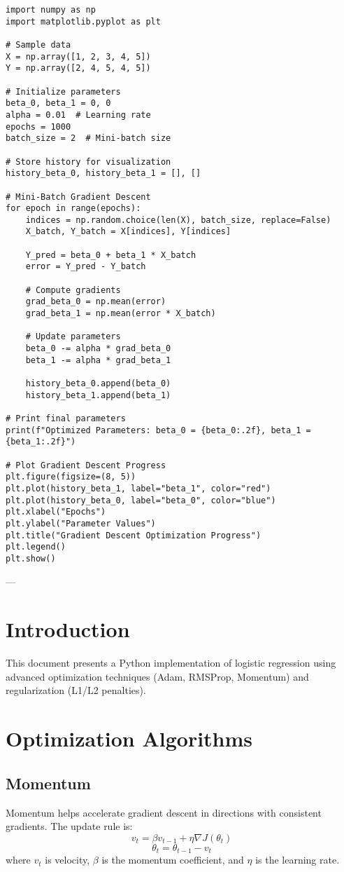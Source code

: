 \begin{verbatim}
import numpy as np
import matplotlib.pyplot as plt

# Sample data
X = np.array([1, 2, 3, 4, 5])
Y = np.array([2, 4, 5, 4, 5])

# Initialize parameters
beta_0, beta_1 = 0, 0
alpha = 0.01  # Learning rate
epochs = 1000
batch_size = 2  # Mini-batch size

# Store history for visualization
history_beta_0, history_beta_1 = [], []

# Mini-Batch Gradient Descent
for epoch in range(epochs):
    indices = np.random.choice(len(X), batch_size, replace=False)
    X_batch, Y_batch = X[indices], Y[indices]
    
    Y_pred = beta_0 + beta_1 * X_batch
    error = Y_pred - Y_batch

    # Compute gradients
    grad_beta_0 = np.mean(error)
    grad_beta_1 = np.mean(error * X_batch)
    
    # Update parameters
    beta_0 -= alpha * grad_beta_0
    beta_1 -= alpha * grad_beta_1

    history_beta_0.append(beta_0)
    history_beta_1.append(beta_1)

# Print final parameters
print(f"Optimized Parameters: beta_0 = {beta_0:.2f}, beta_1 = {beta_1:.2f}")

# Plot Gradient Descent Progress
plt.figure(figsize=(8, 5))
plt.plot(history_beta_1, label="beta_1", color="red")
plt.plot(history_beta_0, label="beta_0", color="blue")
plt.xlabel("Epochs")
plt.ylabel("Parameter Values")
plt.title("Gradient Descent Optimization Progress")
plt.legend()
plt.show()
\end{verbatim}

---

\section{Introduction}
This document presents a Python implementation of logistic regression using advanced optimization techniques (Adam, RMSProp, Momentum) and regularization (L1/L2 penalties). 

\section{Optimization Algorithms}

\subsection{Momentum}
Momentum helps accelerate gradient descent in directions with consistent gradients. The update rule is:
\begin{equation}
v_t = \beta v_{t-1} + \eta \nabla J(\theta_t)
\end{equation}
\begin{equation}
\theta_t = \theta_{t-1} - v_t
\end{equation}
where \( v_t \) is velocity, \( \beta \) is the momentum coefficient, and \( \eta \) is the learning rate.

